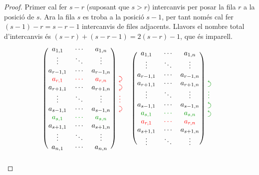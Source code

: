 \begin{lema}
\begin{col}
		\begin{proof}
			Primer cal fer $s-r$ (suposant que $s>r$) intercanvis per posar la fila $r$ a la posició de $s$. Ara la fila $s$ es troba a la posició $s-1$, per tant només cal fer $(s-1)-r = s-r-1$ intercanvis de files adjacents. Llavors el nombre total d'intercanvis és $(s-r)+(s-r-1) = 2(s-r) - 1$, que és imparell.
			\[
				\begin{blockarray}{cccc}
					\begin{block}{(ccc)*{1}{>{\color{red}}l<{}}}
						a_{1,1}&	\cdots&		a_{1,n}& 		\\
						\vdots&		\ddots&		\vdots& 		\\
						a_{r-1,1}&	\cdots&		a_{r-1,n}&    	\\
						\rd a_{r,1}&\rd\cdots&	\rd a_{r,n}&    \dcarr \\
						a_{r+1,1}&	\cdots&		a_{r+1,n}&    	\dcarr\\
						\vdots&		\ddots&		\vdots& 		\vdots\\
						a_{s-1,1}&	\cdots&		a_{s-1,n}&    	\dcarr \\
						\gre a_{s,1}&\gre\cdots&	\gre a_{s,n}&    \\
						a_{s+1,1}&	\cdots&		a_{s+1,n}&    	\\
						\vdots&		\ddots&		\vdots& 		\\
						a_{n,1}&	\cdots&		a_{n,n}& 		\\	
					\end{block}
				\end{blockarray}
				\quad
				\begin{blockarray}{cccc}
					\begin{block}{(ccc)*{1}{>{\color{ForestGreen}}l<{}}}
						a_{1,1}&	\cdots&		a_{1,n}& 		\\
						\vdots&		\ddots&		\vdots& 		\\
						a_{r-1,1}&	\cdots&		a_{r-1,n}&    	\\
						a_{r+1,1}&	\cdots&		a_{r+1,n}&    	\ucarr\\
						\vdots&		\ddots&		\vdots& 		\vdots\\
						a_{s-1,1}&	\cdots&		a_{s-1,n}&    	\ucarr\\
						\gre a_{s,1}&\gre\cdots&	\gre a_{s,n}&    \ucarr\\
						\rd a_{r,1}&\rd\cdots&	\rd a_{r,n}&    \\
						a_{s+1,1}&	\cdots&		a_{s+1,n}&    	\\
						\vdots&		\ddots&		\vdots& 		\\

\end{block}
\end{blockarray}\]
\end{proof}
\end{col}
\end{lema}
